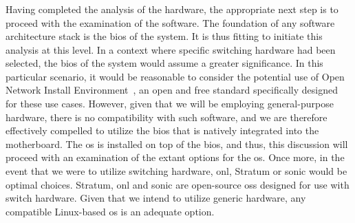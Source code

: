 \subsubsection{}
Having completed the analysis of the hardware, the appropriate next step is to proceed with the examination of the software. The foundation of any software architecture stack is the \gls{bios} of the system. It is thus fitting to initiate this analysis at this level. In a context where specific switching hardware had been selected, the \gls{bios} of the system would assume a greater significance. In this particular scenario, it would be reasonable to consider the potential use of Open Network Install Environment~\cite{noauthor_deploy_nodate}, an open and free standard specifically designed for these use cases. However, given that we will be employing general-purpose hardware, there is no compatibility with such software, and we are therefore effectively compelled to utilize the \gls{bios} that is natively integrated into the motherboard.
The \gls{os} is installed on top of the \gls{bios}, and thus, this discussion will proceed with an examination of the extant options for the \gls{os}. Once more, in the event that we were to utilize switching hardware, \gls{onl}, Stratum or \gls{sonic} would be optimal choices. Stratum, \gls{onl} and \gls{sonic} are open-source \glspl{os} designed for use with switch hardware. Given that we intend to utilize generic hardware, any compatible Linux-based \gls{os} is an adequate option.

